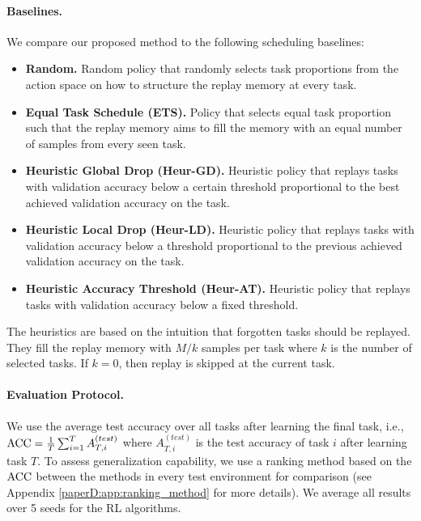 \vspace{-3mm}
\paragraph{Baselines.} We compare our proposed method to the following scheduling baselines: 
\begin{itemize}[topsep=0pt]%
	\item {\bf Random.} Random policy that randomly selects task proportions from the action space on how to structure the replay memory at every task. 
	\item {\bf Equal Task Schedule (ETS).} Policy that selects equal task proportion such that the replay memory aims to fill the memory with an equal number of samples from every seen task. 
	\item {\bf Heuristic Global Drop (Heur-GD).} Heuristic policy that replays tasks with validation accuracy below a certain threshold proportional to the best achieved validation accuracy on the task.
	\item {\bf Heuristic Local Drop (Heur-LD).} Heuristic policy that replays tasks with validation accuracy below a threshold proportional to the previous achieved validation accuracy on the task. 
	\item {\bf Heuristic Accuracy Threshold (Heur-AT).} Heuristic policy that replays tasks with validation accuracy below a fixed threshold. 
\end{itemize}
The heuristics are based on the intuition that forgotten tasks should be replayed. They fill the replay memory with $M/k$ samples per task where $k$ is the number of selected tasks. If $k=0$, then replay is skipped at the current task. 

\vspace{-3mm}
\paragraph{Evaluation Protocol.} We use the average test accuracy over all tasks after learning the final task, i.e., ${\text{ACC}} = \frac{1}{T} \sum_{i=1}^{T} A_{T, i}^{(test)}$ where $A_{T, i}^{(test)}$ is the test accuracy of task $i$ after learning task $T$. 
To assess generalization capability, we use a ranking method based on the ${\text{ACC}}$ between the methods in every test environment for comparison (see Appendix \ref{paperD:app:ranking_method} for more details). We average all results over 5 seeds for the RL algorithms. 




